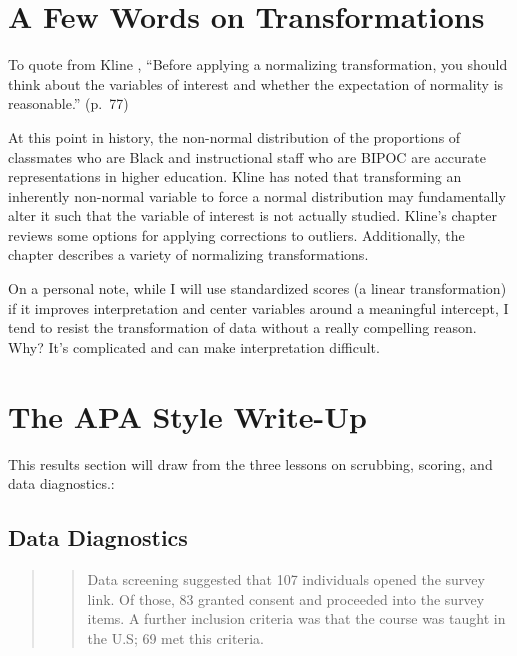 \documentclass[
  11pt,
]{book}
\begin{document}
\hypertarget{a-few-words-on-transformations}{%
\section{A Few Words on Transformations}\label{a-few-words-on-transformations}}

To quote from Kline \citeyearpar{kline_principles_2016}, ``Before applying a normalizing transformation, you should think about the variables of interest and whether the expectation of normality is reasonable.'' (p.~77)

At this point in history, the non-normal distribution of the proportions of classmates who are Black and instructional staff who are BIPOC are accurate representations in higher education. Kline \citeyearpar{kline_principles_2016} has noted that transforming an inherently non-normal variable to force a normal distribution may fundamentally alter it such that the variable of interest is not actually studied. Kline's chapter reviews some options for applying corrections to outliers. Additionally, the chapter describes a variety of normalizing transformations.

On a personal note, while I will use standardized scores (a linear transformation) if it improves interpretation and center variables around a meaningful intercept, I tend to resist the transformation of data without a really compelling reason. Why? It's complicated and can make interpretation difficult.

\hypertarget{the-apa-style-write-up-1}{%
\section{The APA Style Write-Up}\label{the-apa-style-write-up-1}}

This results section will draw from the three lessons on scrubbing, scoring, and data diagnostics.:

\hypertarget{data-diagnostics}{%
\subsection{Data Diagnostics}\label{data-diagnostics}}

\begin{quote}
\begin{quote}
Data screening suggested that 107 individuals opened the survey link. Of those, 83 granted consent and proceeded into the survey items. A further inclusion criteria was that the course was taught in the U.S; 69 met this criteria.
\end{quote}
\end{quote}
\end{document}
